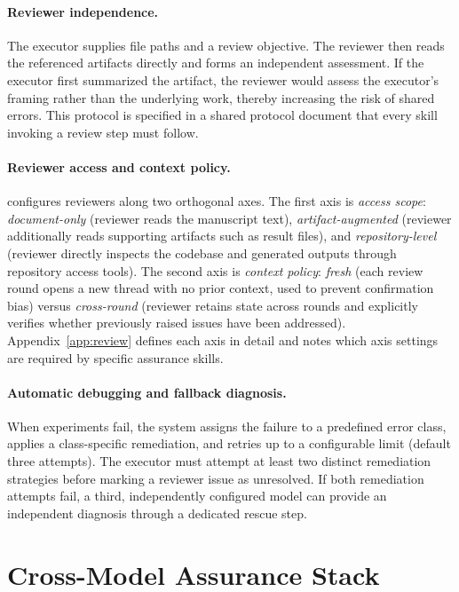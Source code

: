 

\paragraph{Reviewer independence.}
The executor supplies file paths and a review objective.
The reviewer then reads the referenced artifacts directly and forms an independent assessment.
If the executor first summarized the artifact, the reviewer would assess the executor's framing rather than the underlying work, thereby increasing the risk of shared errors.
This protocol is specified in a shared protocol document that every skill invoking a review step must follow.

\paragraph{Reviewer access and context policy.}
\aris{} configures reviewers along two orthogonal axes.
The first axis is \emph{access scope}: \emph{document-only} (reviewer reads the manuscript text), \emph{artifact-augmented} (reviewer additionally reads supporting artifacts such as result files), and \emph{repository-level} (reviewer directly inspects the codebase and generated outputs through repository access tools).
The second axis is \emph{context policy}: \emph{fresh} (each review round opens a new thread with no prior context, used to prevent confirmation bias) versus \emph{cross-round} (reviewer retains state across rounds and explicitly verifies whether previously raised issues have been addressed).
Appendix~\ref{app:review} defines each axis in detail and notes which axis settings are required by specific assurance skills.

\paragraph{Automatic debugging and fallback diagnosis.}
When experiments fail, the system assigns the failure to a predefined error class, applies a class-specific remediation, and retries up to a configurable limit (default three attempts).
The executor must attempt at least two distinct remediation strategies before marking a reviewer issue as unresolved.
If both remediation attempts fail, a third, independently configured model can provide an independent diagnosis through a dedicated rescue step.

\section{Cross-Model Assurance Stack}
\label{sec:assurance}

